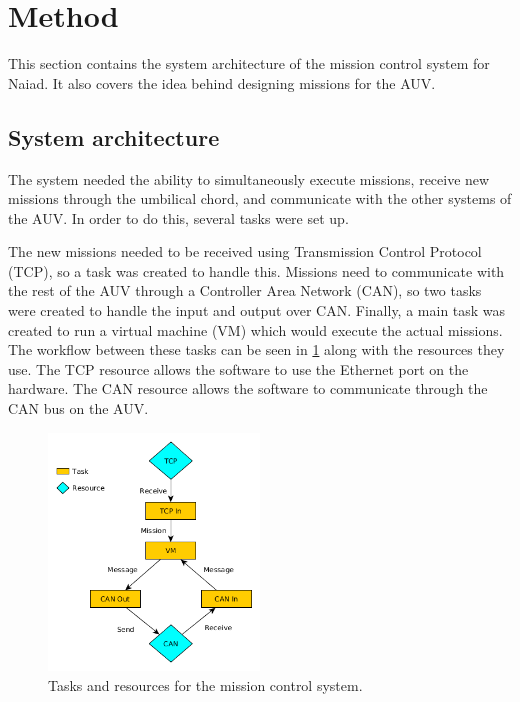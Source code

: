 \section{Method}\label{sec:method}
This section contains the system architecture of the mission control system for Naiad. It also covers the idea behind designing missions for the AUV.

\subsection{System architecture}
The system needed the ability to simultaneously execute missions, receive new missions through the umbilical chord, and communicate with the other systems of the AUV. In order to do this, several tasks were set up.


The new missions needed to be received using Transmission Control Protocol (TCP), so a task was created to handle this. Missions need to communicate with the rest of the AUV through a Controller Area Network (CAN), so two tasks were created to handle the input and output over CAN. Finally, a main task was created to run a virtual machine (VM) which would execute the actual missions. The workflow between these tasks can be seen in \cref{fig:data_flow_figure} along with the resources they use. The TCP resource allows the software to use the Ethernet port on the hardware. The CAN resource allows the software to communicate through the CAN bus on the AUV.

\pageref{fig:data_flow_figure}
\begin{figure}[h]
    \includegraphics[width=0.5\textwidth]{./figure/figureTasksAndResources.png}
    \caption{Tasks and resources for the mission control system.}
    \label{fig:data_flow_figure}
\end{figure}


